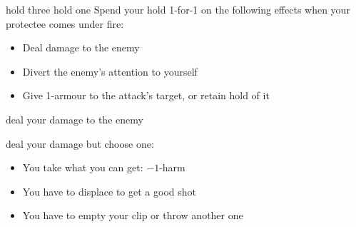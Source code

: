 {hold three}
{hold one}
Spend your hold 1-for-1 on the following effects when your protectee comes under fire:
\begin{itemize}
\item Deal damage to the enemy
\item Divert the enemy's attention to yourself
\item Give 1-armour to the attack's target, or retain hold of it
\end{itemize}

%
%  
%
%
%
%
%


{deal your damage to the enemy}
{deal your damage but choose one:
\begin{itemize}
\item You take what you can get: $-1$-harm
\item You have to displace to get a good shot
\item You have to empty your clip or throw another one
\end{itemize}}

